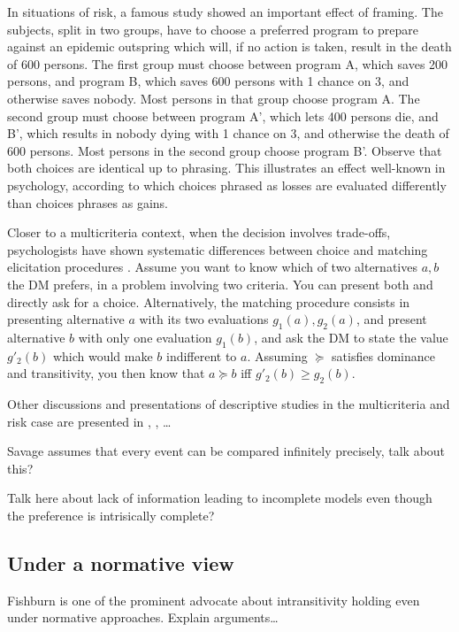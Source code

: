 \documentclass[french, english]{llncs}
\begin{document}
In situations of risk, a famous study \citep{tversky_1981} showed an important effect of framing. The subjects, split in two groups, have to choose a preferred program to prepare against an epidemic outspring which will, if no action is taken, result in the death of 600 persons. The first group must choose between program A, which saves 200 persons, and program B, which saves 600 persons with 1 chance on 3, and otherwise saves nobody. Most persons in that group choose program A. The second group must choose between program A', which lets 400 persons die, and B', which results in nobody dying with 1 chance on 3, and otherwise the death of 600 persons. Most persons in the second group choose program B'. Observe that both choices are identical up to phrasing. This illustrates an effect well-known in psychology, according to which choices phrased as losses are evaluated differently than choices phrases as gains.

Closer to a multicriteria context, when the decision involves trade-offs, psychologists have shown systematic differences between choice and matching elicitation procedures \citep{tversky_contingent_1988}. Assume you want to know which of two alternatives $a, b$ the \ac{DM} prefers, in a problem involving two criteria. You can present both and directly ask for a choice. Alternatively, the matching procedure consists in presenting alternative $a$ with its two evaluations $g_1(a), g_2(a)$, and present alternative $b$ with only one evaluation $g_1(b)$, and ask the \ac{DM} to state the value $g'_2(b)$ which would make $b$ indifferent to $a$. Assuming $\succeq$ satisfies dominance and transitivity, you then know that $a \succeq b$ iff $g'_2(b) ≥ g_2(b)$.

Other discussions and presentations of descriptive studies in the multicriteria and risk case are presented in \citet[Ch. 2]{deparis_2012}, \citet{slovic_construction_2006}, …

Savage assumes that every event can be compared infinitely precisely, talk about this?

Talk here about lack of information leading to incomplete models even though the preference is intrisically complete?

\subsection{Under a normative view}
Fishburn is one of the prominent advocate about intransitivity holding even under normative approaches. Explain arguments…
\end{document}
